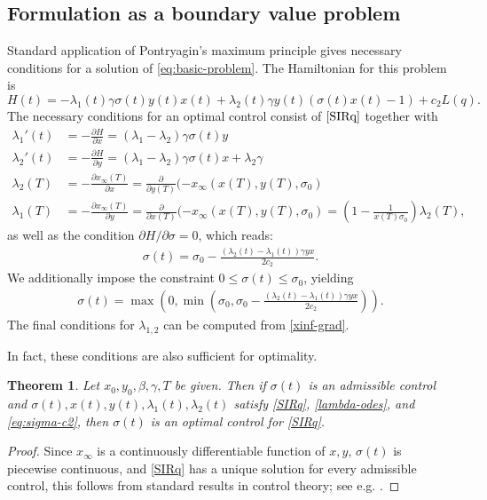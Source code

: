 \documentclass[english,12pt,letter]{article}
\newtheorem{thm}{Theorem}
\newcommand{\Sinf}{x_\infty}
\begin{document}
\subsection{Formulation as a boundary value problem}
Standard application of Pontryagin's maximum principle gives necessary conditions
for a solution of \eqref{eq:basic-problem}.  The Hamiltonian for this problem is
$$
    H(t) = -\lambda_1(t) \gamma \sigma(t) y(t) x(t) + \lambda_2(t)\gamma y(t)(\sigma(t) x(t) - 1) + c_2 L(q).
$$
The necessary conditions for an optimal control consist of $\eqref{SIRq}$ together with
\begin{subequations}\label{lambda-odes}
\begin{align} 
    \lambda_1'(t) & = -\frac{\partial H}{\partial x} = (\lambda_1-\lambda_2)\gamma\sigma(t) y \\
    \lambda_2'(t) & = -\frac{\partial H}{\partial y} = (\lambda_1-\lambda_2)\gamma\sigma(t) x + \lambda_2 \gamma \\
    \lambda_2(T) & = -\frac{\partial \Sinf(T)}{\partial x} = \frac{\partial }{\partial y(T)} (-x_\infty(x(T),y(T),\sigma_0) \\
    \lambda_1(T) & = -\frac{\partial \Sinf(T)}{\partial y} =\frac{\partial }{\partial x(T)} (-x_\infty(x(T),y(T),\sigma_0) = \left(1-\frac{1}{x(T)\sigma_0}\right)\lambda_2(T),
\end{align}
\end{subequations}
as well as the condition $\partial H/\partial \sigma = 0$, which reads:
\begin{align*}
    \sigma(t) = \sigma_0 - \frac{(\lambda_2(t)-\lambda_1(t))\gamma y x}{2c_2}.
\end{align*}
We additionally impose the constraint $0\le \sigma(t) \le \sigma_0$, yielding
\begin{align} \label{eq:sigma-c2}
    \sigma(t) = \max\left(0,\min\left(\sigma_0,\sigma_0 - \frac{(\lambda_2(t)-\lambda_1(t))\gamma y x}{2c_2}\right)\right).
\end{align}
The final conditions for $\lambda_{1,2}$ can be computed from \eqref{xinf-grad}.

In fact, these conditions are also sufficient for optimality.
\begin{thm}
    Let $x_0, y_0, \beta, \gamma, T$ be given.  Then if $\sigma(t)$ is an admissible control and
    $\sigma(t), x(t), y(t), \lambda_1(t), \lambda_2(t)$ satisfy \eqref{SIRq}, \eqref{lambda-odes},
    and \eqref{eq:sigma-c2}, then $\sigma(t)$ is an optimal control for \eqref{SIRq}.
\end{thm}
\begin{proof}
    Since $\Sinf$ is a continuously differentiable function of $x, y$, $\sigma(t)$ is piecewise
    continuous, and \eqref{SIRq} has a unique solution for every admissible control,
    this follows from standard results in control theory; see e.g. \cite[Thm. 3.4.1]{speyer2010primer}.
\end{proof}
\end{document}
